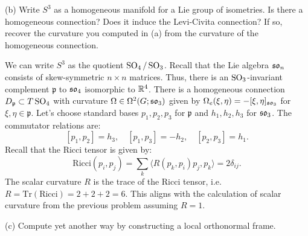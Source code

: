 \documentclass{../../templates/lkx_pset}
\begin{document}
\begin{parts}
  \begin{part}{(b)}
    Write $S^3$ as a homogeneous manifold for a Lie group of isometries. Is there a homogeneous connection? Does it induce the Levi-Civita connection? If so, recover the curvature you computed in (a) from the curvature of the homogeneous connection.
  \end{part}

  We can write $S^3$ as the quotient $\operatorname{SO}_4 / \operatorname{SO}_3$. Recall that the Lie algebra $\mathfrak{so}_n$ consists of skew-symmetric $n\times n$ matrices. Thus, there is an $\operatorname{SO}_3$-invariant complement $\mathfrak{p}$ to $\mathfrak{so}_4$ isomorphic to $\mathbb{R}^4$.
  There is a homogeneous connection $D_{\mathfrak{p}}\subset T\operatorname{SO}_4$ with curvature $\Omega\in \Omega^2(G; \mathfrak{so}_3)$ given by $\Omega_e(\xi,\eta) = -[\xi,\eta]_{\mathfrak{so}_3}$ for $\xi,\eta\in \mathfrak{p}$. Let's choose standard bases $p_1,p_2,p_3$ for $\mathfrak{p}$ and $h_1,h_2,h_3$ for $\mathfrak{so}_3$. The commutator relations are:
  \[
    [p_1, p_2] = h_3,\quad [p_1, p_3] = -h_2,\quad [p_2, p_3] = h_1.
  \]
  Recall that the Ricci tensor is given by:
  \[
    \textrm{Ricci}(p_i, p_j) = \sum_{k} \langle R(p_k, p_i)p_j, p_k\rangle = 2\delta_{ij}.
  \]
  The scalar curvature $R$ is the trace of the Ricci tensor, i.e. $R = \textrm{Tr}(\textrm{Ricci}) = 2+2+2=6$. This aligns with the calculation of scalar curvature from the previous problem assuming $R=1$.

  \begin{part}{(c)}
    Compute yet another way by constructing a local orthonormal frame.
  \end{part}


\end{parts}
\end{document}
